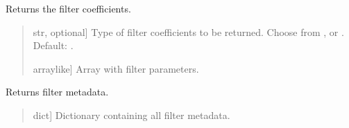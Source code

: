 \documentclass[letterpaper,10pt,english]{sphinxmanual}
\begin{document}
\begin{fulllineitems}
\begin{fulllineitems}
\begin{quote}
\begin{description}
\end{description}\end{quote}

\end{fulllineitems}


\begin{fulllineitems}
\label{\detokenize{classes:dsptoolbox.classes.filter_class.Filter.get_coefficients}}
\pysigstartsignatures
{}
\pysigstopsignatures
\sphinxAtStartPar
Returns the filter coefficients.
\begin{quote}\begin{description}
\begin{description}
\sphinxlineitem{\sphinxstylestrong{mode}}{[}str, optional{]}
\sphinxAtStartPar
Type of filter coefficients to be returned. Choose from ,
 or . Default: .

\end{description}

\begin{description}
\sphinxlineitem{\sphinxstylestrong{coefficients}}{[}array\sphinxhyphen{}like{]}
\sphinxAtStartPar
Array with filter parameters.

\end{description}

\end{description}\end{quote}

\end{fulllineitems}


\begin{fulllineitems}
\label{\detokenize{classes:dsptoolbox.classes.filter_class.Filter.get_filter_metadata}}
\pysigstartsignatures
{}
\pysigstopsignatures
\sphinxAtStartPar
Returns filter metadata.
\begin{quote}\begin{description}
\begin{description}
\sphinxlineitem{\sphinxstylestrong{info}}{[}dict{]}
\sphinxAtStartPar
Dictionary containing all filter metadata.


\end{description}
\end{description}
\end{quote}
\end{fulllineitems}
\end{fulllineitems}
\end{document}

